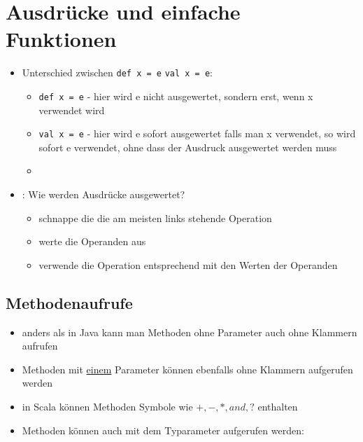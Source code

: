 \section{Ausdrücke und einfache Funktionen}
\begin{itemize}
  \item Unterschied zwischen \texttt{def x = e} \und \texttt{val x = e}:
  \begin{itemize}
    \item \texttt{def x = e} - hier wird e nicht ausgewertet, sondern erst,
    wenn x verwendet wird
    \item \texttt{val x = e} - hier wird e sofort ausgewertet \und falls
    man x verwendet, so wird sofort e verwendet, ohne dass der Ausdruck
    ausgewertet werden muss
    \item 
  \end{itemize}
  \item {}: Wie werden Ausdrücke ausgewertet? \begin{itemize}
    \item schnappe die die am meisten links stehende Operation
    \item werte die Operanden aus
    \item verwende die Operation entsprechend mit den Werten der Operanden
  \end{itemize}
\end{itemize}


\subsection{Methodenaufrufe}
\begin{itemize}
  \item anders als in Java kann man Methoden ohne Parameter auch ohne Klammern aufrufen
  \item Methoden mit \uline{einem} Parameter können ebenfalls ohne Klammern aufgerufen werden
  
  
  
  \item in Scala können Methoden Symbole wie
  $+, -, *, and, ?$ enthalten
  \item Methoden können auch mit dem Typarameter aufgerufen werden:
  
  
  
\end{itemize}


